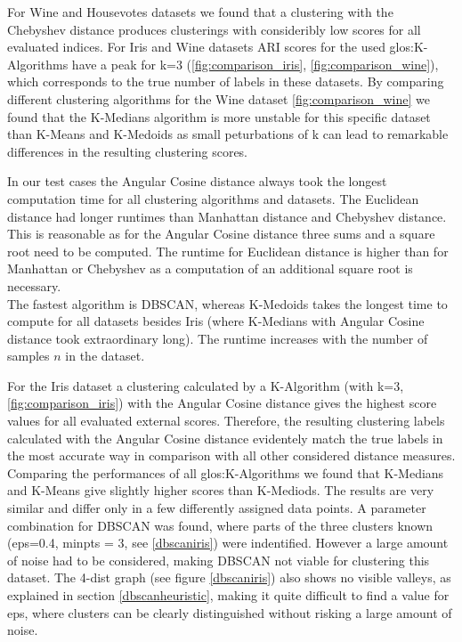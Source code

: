 


For Wine and Housevotes datasets we found that a clustering with the Chebyshev distance produces clusterings with consideribly low scores for all evaluated indices. 
For Iris and Wine datasets ARI scores for the used \Gls{glos:K-Algorithms} have a peak for k=3 (\autoref{fig:comparison_iris}, \autoref{fig:comparison_wine}), which corresponds to the true number of labels in these datasets.  
By comparing different clustering algorithms for the Wine dataset \autoref{fig:comparison_wine} we found that the K-Medians algorithm is more unstable for this specific dataset than K-Means and K-Medoids as small peturbations of k can lead to remarkable differences in the resulting clustering scores. 

In our test cases the Angular Cosine distance always took the longest computation time for all clustering algorithms and datasets. The Euclidean distance had longer runtimes than Manhattan distance and Chebyshev distance. This is reasonable as for the Angular Cosine distance three sums and a square root need to be computed. The runtime for Euclidean distance is higher than for Manhattan or Chebyshev as a computation of an additional square root is necessary.\\
The fastest algorithm is DBSCAN, whereas K-Medoids takes the longest time to compute for all datasets besides Iris (where K-Medians with Angular Cosine distance took extraordinary long). The runtime increases with the number of samples $n$ in the dataset. 

For the Iris dataset a clustering calculated by a K-Algorithm (with k=3, \autoref{fig:comparison_iris}) with the Angular Cosine distance gives the highest score values for all evaluated external scores. Therefore, the resulting clustering labels calculated with the Angular Cosine distance evidentely match the true labels in the most accurate way in comparison with all other considered distance measures. Comparing the performances of all \Gls{glos:K-Algorithms} we found that K-Medians and K-Means give slightly higher scores than K-Mediods. The results are very similar and differ only in a few differently assigned data points.
A parameter combination for DBSCAN was found, where parts of the three clusters known (eps=0.4, minpts = 3, see \autoref{dbscaniris}) were indentified. However a large amount of noise had to be considered, making DBSCAN not viable for clustering this dataset. The 4-dist graph (see figure \autoref{dbscaniris}) also shows no visible valleys, as explained in section \ref{dbscanheuristic}, making it quite difficult to find a value for eps, where clusters can be clearly distinguished without risking a large amount of noise.

